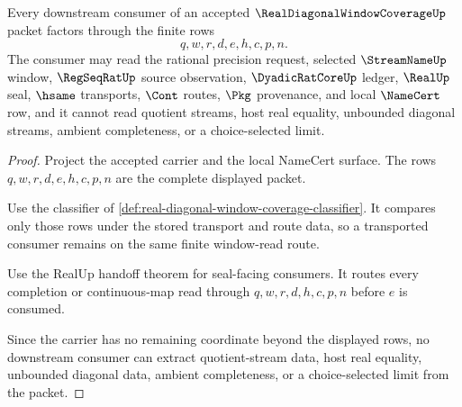 \begin{theorem}
\label{thm:real-diagonal-window-coverage-nonescape}
Every downstream consumer of an accepted $\RealDiagonalWindowCoverageUp$ packet factors through the finite rows
$$
q,w,r,d,e,h,c,p,n.
$$
The consumer may read the rational precision request, selected $\StreamNameUp$ window, $\RegSeqRatUp$ source observation, $\DyadicRatCoreUp$ ledger, $\RealUp$ seal, $\hsame$ transports, $\Cont$ routes, $\Pkg$ provenance, and local $\NameCert$ row, and it cannot read quotient streams, host real equality, unbounded diagonal streams, ambient completeness, or a choice-selected limit.
\end{theorem}
\begin{proof}
Project the accepted carrier and the local NameCert surface. The rows $q,w,r,d,e,h,c,p,n$ are the complete displayed packet.

Use the classifier of \autoref{def:real-diagonal-window-coverage-classifier}. It compares only those rows under the stored transport and route data, so a transported consumer remains on the same finite window-read route.

Use the RealUp handoff theorem for seal-facing consumers. It routes every completion or continuous-map read through $q,w,r,d,h,c,p,n$ before $e$ is consumed.

Since the carrier has no remaining coordinate beyond the displayed rows, no downstream consumer can extract quotient-stream data, host real equality, unbounded diagonal data, ambient completeness, or a choice-selected limit from the packet.
\end{proof}

